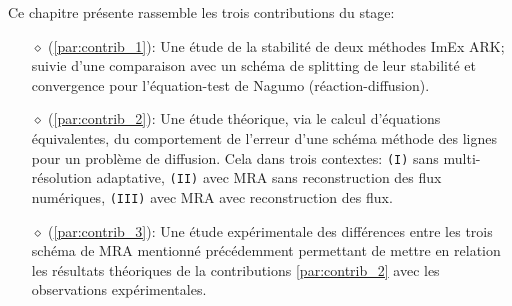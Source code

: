 Ce chapitre présente rassemble les trois contributions du stage:
\begin{itemize}
    \item[$\diamond$] (\ref{par:contrib_1}): Une étude de la stabilité de deux méthodes ImEx ARK;
    suivie d'une comparaison avec un schéma de splitting de leur stabilité et convergence pour l'équation-test de Nagumo (réaction-diffusion).
    \item[$\diamond$] (\ref{par:contrib_2}): Une étude théorique, via le calcul d'équations équivalentes, 
    du comportement de l'erreur d'une schéma méthode des lignes pour un problème de diffusion. 
    Cela dans trois contextes: 
    \texttt{(I)} sans multi-résolution adaptative, 
    \texttt{(II)} avec MRA sans reconstruction des flux numériques,
    \texttt{(III)} avec MRA avec reconstruction des flux.
    \item[$\diamond$] (\ref{par:contrib_3}): Une étude expérimentale des différences entre les trois schéma de MRA mentionné précédemment 
    permettant de mettre en relation les résultats théoriques de la contributions \ref{par:contrib_2} avec les observations expérimentales.
\end{itemize}